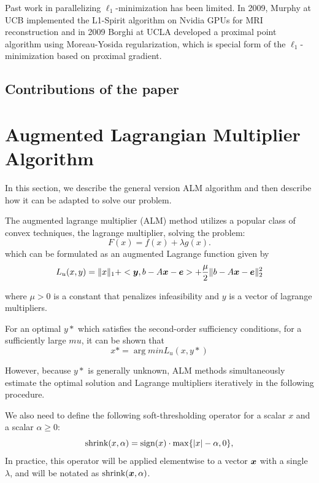 \documentclass[10pt,twocolumn,letterpaper]{article}
\begin{document}
Past work in parallelizing $\ell_1$-minimization has been limited.  In 2009, Murphy at UCB implemented the L1-Spirit algorithm on Nvidia GPUs for MRI reconstruction and in 2009 Borghi at UCLA developed a proximal point algorithm using Moreau-Yosida regularization, which is special form of the $\ell_1$-minimization based on proximal gradient.  

\subsection{Contributions of the paper}

\section{Augmented Lagrangian Multiplier Algorithm}

In this section, we describe the general version ALM algorithm and then describe how it can be adapted to solve our problem.

The augmented lagrange multiplier (ALM) method utilizes a popular class of convex techniques, the lagrange multiplier, solving the problem:
\begin{equation}
F(x) = f(x) + \lambda g(x).
\end{equation}
which can be formulated as an augmented Lagrange function given by
\begin{equation}
L_u(x,y) = \|x\|_1 + <\boldsymbol{y}, b - A{\boldsymbol{x}} - \boldsymbol{e}> + \frac{\mu}2 \| b-A{\boldsymbol{x}}-\boldsymbol{e} \|_2^2
\end{equation}

where $\mu > 0$ is a constant that penalizes infeasibility and $y$ is a vector of lagrange multipliers.

For an optimal $y*$ which satisfies the second-order sufficiency conditions, for a sufficiently large $mu$, it can be shown that
\begin{equation}
x* = \arg min L_u(x,y*)
\end{equation}

However, because $y*$ is generally unknown, ALM methods simultaneously estimate the optimal solution and Lagrange multipliers iteratively in the following procedure.

We also need to define the following soft-thresholding operator for a
scalar $x$ and a scalar $\alpha \geq 0$:
\begin{equation}
\textup{shrink}(x,\alpha) = \textup{sign}(x)\cdot \max \{|x| - \alpha, 0\},
\end{equation}
In practice, this operator will be applied elementwise to a vector ${\boldsymbol{x}}$ with a single $\lambda$,
and will be notated as $\textup{shrink}({\boldsymbol{x}},\alpha)$.
\end{document}
